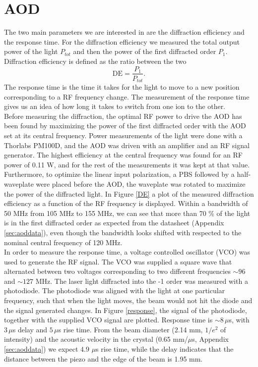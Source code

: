 \section{AOD}
\label{sec:resultaod}
The two main parameters we are interested in are the diffraction efficiency and the response time. For the diffraction efficiency we measured the total output power of the light $P_{tot}$ and then the power of the first diffracted order $P_{1}$. Diffraction efficiency is defined as the ratio between the two
\begin{equation}
\label{eq:de}
\text{DE} = \frac{P_1}{P_{tot}}.
\end{equation}
The response time is the time it takes for the light to move to a new position corresponding to a RF frequency change. The measurement of the response time gives us an idea of how long it takes to switch from one ion to the other.\\
Before measuring the diffraction, the optimal RF power to drive the AOD has been found by maximizing the power of the first diffracted order with the AOD set at its central frequency. Power measurements of the light were done with a Thorlabs PM100D, and the AOD was driven with an amplifier and an RF signal generator. The highest efficiency at the central frequency was found for an RF power of 0.11 W, and for the rest of the measurements it was kept at that value. Furthermore, to optimize the linear input polarization, a PBS followed by a half-waveplate were placed before the AOD, the waveplate was rotated to maximize the power of the diffracted light. In Figure \ref{DE} a plot of the measured diffraction efficiency as a function of the RF frequency is displayed. Within a bandwidth of 50 MHz from 105 MHz to 155 MHz, we can see that more than 70 \% of the light is in the first diffracted order as expected from the datasheet (Appendix \ref{sec:aoddata}), even though the bandwidth looks shifted with respected to the nominal central frequency of 120 MHz.\\
In order to measure the response time, a voltage controlled oscillator (VCO) was used to generate the RF signal. The VCO was supplied a square wave that alternated between two voltages corresponding to two different frequencies $\sim 96$ and $\sim 127$ MHz. The laser light diffracted into the -1 order was measured with a photodiode. The photodiode was aligned with the light at one particular frequency, such that when the light moves, the beam would not hit the diode and the signal generated changes. In Figure \ref{response}, the signal of the photodiode, together with the supplied VCO signal are plotted. Response time is $\sim 8\,\mu$s, with $3\,\mu$s delay and $5\,\mu$s rise time. From the beam diameter (2.14 mm, $1/e^2$ of intensity) and the acoustic velocity in the crystal (0.65 mm/$\mu$s, Appendix \ref{sec:aoddata}) we expect $4.9$ $\mu$s rise time, while the delay indicates that the distance between the piezo and the edge of the beam is 1.95 mm.

